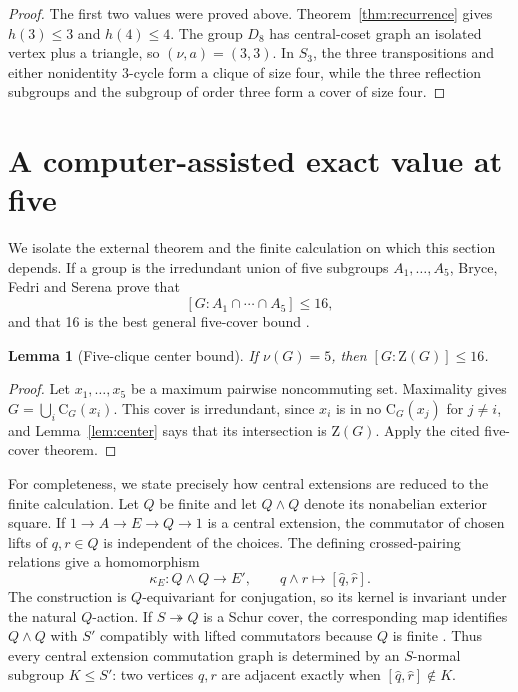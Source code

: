 \documentclass[11pt]{article}
\newtheorem{lemma}[theorem]{Lemma}
\theoremstyle{remark}
\newcommand{\nuG}{\nu}
\newcommand{\aG}{a}
\newcommand{\Z}{\mathrm Z}
\newcommand{\CG}{\mathrm C}
\begin{document}
\begin{proof}
The first two values were proved above.  Theorem~\ref{thm:recurrence} gives
$h(3)\le3$ and $h(4)\le4$.  The group $D_8$ has central-coset graph an
isolated vertex plus a triangle, so $(\nuG,\aG)=(3,3)$.  In $S_3$, the
three transpositions and either nonidentity $3$-cycle form a clique of size
four, while the three reflection subgroups and the subgroup of order three
form a cover of size four.
\end{proof}

\section{A computer-assisted exact value at five}

We isolate the external theorem and the finite calculation on which this
section depends.  If a group is the irredundant union of five subgroups
$A_1,\ldots,A_5$, Bryce, Fedri and Serena prove that
\[
 [G:A_1\cap\cdots\cap A_5]\le16,
\]
and that 16 is the best general five-cover bound
\cite[Theorem~1.2, pp.~470, 475--476]{bryce_fedri_serena_1997}.

\begin{lemma}[Five-clique center bound]\label{lem:index-five}
If $\nuG(G)=5$, then $[G:\Z(G)]\le16$.
\end{lemma}

\begin{proof}
Let $x_1,\ldots,x_5$ be a maximum pairwise noncommuting set.  Maximality
gives $G=\bigcup_i\CG_G(x_i)$.  This cover is irredundant, since $x_i$ is
in no $\CG_G(x_j)$ for $j\ne i$, and Lemma~\ref{lem:center} says that its
intersection is $\Z(G)$.  Apply the cited five-cover theorem.
\end{proof}

For completeness, we state precisely how central extensions are reduced to
the finite calculation.  Let $Q$ be finite and let $Q\wedge Q$ denote its
nonabelian exterior square.  If
$1\to A\to E\to Q\to1$ is a central extension, the commutator of chosen
lifts of $q,r\in Q$ is independent of the choices.  The defining crossed-pairing
relations give a homomorphism
\[
 \kappa_E:Q\wedge Q\longrightarrow E',\qquad
 q\wedge r\longmapsto[\widehat q,\widehat r].                 \tag{1}
\]
The construction is $Q$-equivariant for conjugation, so its kernel is
invariant under the natural $Q$-action. If
$S\twoheadrightarrow Q$ is a Schur cover, the corresponding map identifies
$Q\wedge Q$ with $S'$ compatibly with lifted commutators because $Q$ is finite
\cite[Proposition~7 and Corollary~2, pp.~182--183]
{brown_johnson_robertson_1987}. Thus every central extension
commutation graph is determined by an $S$-normal subgroup $K\le S'$:
two vertices $q,r$ are adjacent exactly when
$[\widehat q,\widehat r]\notin K$.
\end{document}
